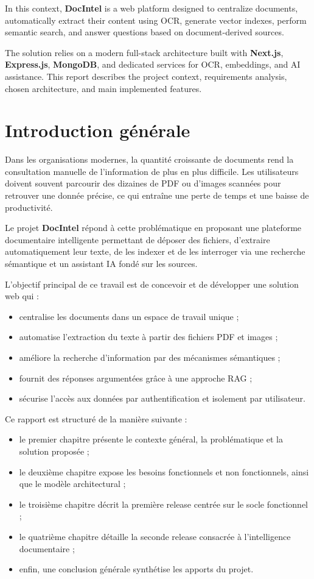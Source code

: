 \documentclass[12pt,a4paper]{report}
\begin{document}
In this context, \textbf{DocIntel} is a web platform designed to centralize documents, automatically extract their content using OCR, generate vector indexes, perform semantic search, and answer questions based on document-derived sources.

The solution relies on a modern full-stack architecture built with \textbf{Next.js}, \textbf{Express.js}, \textbf{MongoDB}, and dedicated services for OCR, embeddings, and AI assistance. This report describes the project context, requirements analysis, chosen architecture, and main implemented features.

\tableofcontents
\listoffigures
\listoftables
\clearpage

\chapter{Introduction g\'en\'erale}
Dans les organisations modernes, la quantité croissante de documents rend la consultation manuelle de l'information de plus en plus difficile. Les utilisateurs doivent souvent parcourir des dizaines de PDF ou d'images scannées pour retrouver une donnée précise, ce qui entraîne une perte de temps et une baisse de productivité.

Le projet \textbf{DocIntel} répond à cette problématique en proposant une plateforme documentaire intelligente permettant de déposer des fichiers, d'extraire automatiquement leur texte, de les indexer et de les interroger via une recherche sémantique et un assistant IA fondé sur les sources.

L'objectif principal de ce travail est de concevoir et de développer une solution web qui :
\begin{itemize}
  \item centralise les documents dans un espace de travail unique ;
  \item automatise l'extraction du texte à partir des fichiers PDF et images ;
  \item améliore la recherche d'information par des mécanismes sémantiques ;
  \item fournit des réponses argumentées grâce à une approche RAG ;
  \item sécurise l'accès aux données par authentification et isolement par utilisateur.
\end{itemize}

Ce rapport est structuré de la manière suivante :
\begin{itemize}
  \item le premier chapitre présente le contexte général, la problématique et la solution proposée ;
  \item le deuxième chapitre expose les besoins fonctionnels et non fonctionnels, ainsi que le modèle architectural ;
  \item le troisième chapitre décrit la première release centrée sur le socle fonctionnel ;
  \item le quatrième chapitre détaille la seconde release consacrée à l'intelligence documentaire ;
  \item enfin, une conclusion générale synthétise les apports du projet.
\end{itemize}
\end{document}
